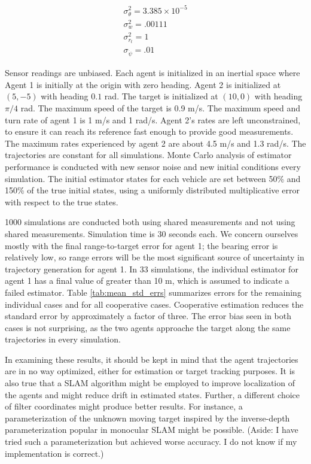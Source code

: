 \documentclass{aiaa-tc}
\begin{document}
\begin{align}
\sigma_\theta^2 = 3.385 \times 10^{-5} \\
\sigma_w^2 = .00111 \\
\sigma_{r_t}^2 = 1 \\
\sigma_{\dot{\psi}} = .01
\end{align}

Sensor readings are unbiased. Each agent is initialized in an inertial space where Agent 1 is initially at the origin with zero heading. Agent 2 is initialized at $(5,-5)$ with heading $0.1$ rad. The target is initialized at $(10,0)$ with heading $\pi/4$ rad. The maximum speed of the target is 0.9 m/s. The maximum speed and turn rate of agent 1 is 1 m/s and 1 rad/s. Agent 2's rates are left unconstrained, to ensure it can reach its reference fast enough to provide good measurements. The maximum rates experienced by agent 2 are about 4.5 m/s and 1.3 rad/s. The trajectories are constant for all simulations. Monte Carlo analysis of estimator performance is conducted with new sensor noise and new initial conditions every simulation. The initial estimator states for each vehicle are set between 50\% and 150\% of the true initial states, using a uniformly distributed multiplicative error with respect to the true states.

1000 simulations are conducted both using shared measurements and not using shared measurements. Simulation time is 30 seconds each. We concern ourselves mostly with the final range-to-target error for agent 1; the bearing error is relatively low, so range errors will be the most significant source of uncertainty in trajectory generation for agent 1. In 33 simulations, the individual estimator for agent 1 has a final value of greater than 10 m, which is assumed to indicate a failed estimator. Table \ref{tab:mean_std_errs} summarizes errors for the remaining individual cases and for all cooperative cases. Cooperative estimation reduces the standard error by approximately a factor of three. The error bias seen in both cases is not surprising, as the two agents approache the target along the same trajectories in every simulation.

In examining these results, it should be kept in mind that the agent trajectories are in no way optimized, either for estimation or target tracking purposes. It is also true that a SLAM algorithm might be employed to improve localization of the agents and might reduce drift in estimated states. Further, a different choice of filter coordinates might produce better results. For instance, a parameterization of the unknown moving target inspired by the inverse-depth parameterization popular in monocular SLAM might be possible. (Aside: I have tried such a parameterization but achieved worse accuracy. I do not know if my implementation is correct.)
\end{document}
